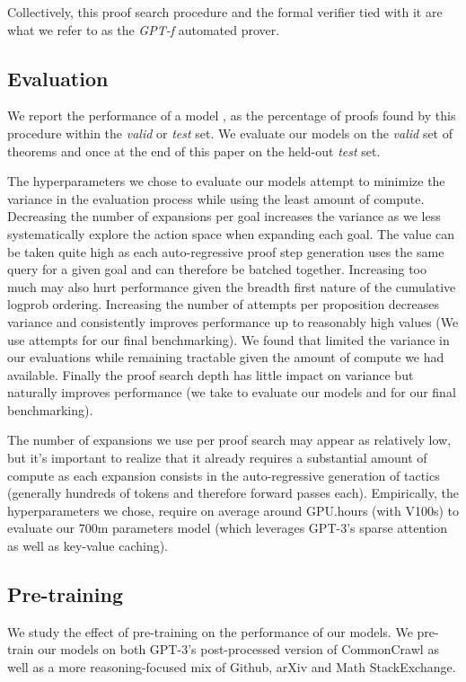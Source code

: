 \documentclass{article}
\begin{document}
Collectively, this proof search procedure and the formal verifier tied with it are what we refer to as the \textit{GPT-f} automated prover.

\subsection{Evaluation}

We report the performance  of a model , as the percentage of proofs found by this procedure within the \textit{valid} or \textit{test} set. We evaluate our models on the \textit{valid} set of  theorems and once at the end of this paper on the held-out \textit{test} set.

The hyperparameters we chose to evaluate our models attempt to minimize the variance in the evaluation process while using the least amount of compute. Decreasing the number of expansions per goal  increases the
variance as we less systematically explore the action space when expanding each goal. The  value can be taken quite high as each auto-regressive proof step generation uses the same query for a given goal and can therefore be batched together. Increasing  too much may also hurt performance given the breadth first nature of the cumulative logprob ordering. Increasing the number of attempts per proposition  decreases variance and consistently improves performance up to reasonably high values (We use  attempts for our final benchmarking). We found that  limited the variance in our evaluations while remaining tractable given the amount of compute we had available. Finally the proof search depth  has little impact on variance but naturally improves performance (we take  to evaluate our models and  for our final benchmarking).

The number of expansions we use per proof search may appear as relatively low, but it's important to realize that it already requires a substantial amount of compute as each expansion consists in the auto-regressive generation of  tactics (generally hundreds of tokens and therefore forward passes each). Empirically, the hyperparameters we chose, require on average around  GPU.hours (with V100s) to evaluate our 700m parameters model (which leverages GPT-3's sparse attention as well as key-value caching).

\subsection{Pre-training}

We study the effect of pre-training on the performance of our models. We pre-train our models on both GPT-3's post-processed version of CommonCrawl as well as a more reasoning-focused mix of Github, arXiv and Math StackExchange.
\end{document}
